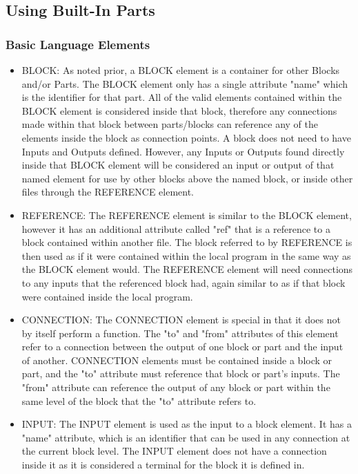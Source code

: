 \subsection{Using Built-In Parts}
\subsubsection{Basic Language Elements}
\begin{itemize}[label={}]
    \item BLOCK:
As noted prior, a BLOCK element is a container for other Blocks and/or Parts.
The BLOCK element only has a single attribute "name" which is the identifier for that part.
All of the valid elements contained within the BLOCK element is considered inside that block, therefore any connections made within that block between parts/blocks can reference any of the elements inside the block as connection points. A block does not need to have Inputs and Outputs defined. However, any Inputs or Outputs found directly inside that BLOCK element will be considered an input or output of that named element for use by other blocks above the named block, or inside other files through the REFERENCE element.
    \item REFERENCE:
The REFERENCE element is similar to the BLOCK element, however it has an additional attribute called "ref" that is a reference to a block contained within another file.
The block referred to by REFERENCE is then used as if it were contained within the local program in the same way as the BLOCK element would.
The REFERENCE element will need connections to any inputs that the referenced block had, again similar to as if that block were contained inside the local program.
    \item CONNECTION:
The CONNECTION element is special in that it does not by itself perform a function.
The "to" and "from" attributes of this element refer to a connection between the output of one block or part and the input of another.
CONNECTION elements must be contained inside a block or part, and the "to" attribute must reference that block or part's inputs.
The "from" attribute can reference the output of any block or part within the same level of the block that the "to" attribute refers to.
    \item INPUT:
The INPUT element is used as the input to a block element.
It has a "name" attribute, which is an identifier that can be used in any connection at the current block level.
The INPUT element does not have a connection inside it as it is considered a terminal for the block it is defined in.

\end{itemize}
